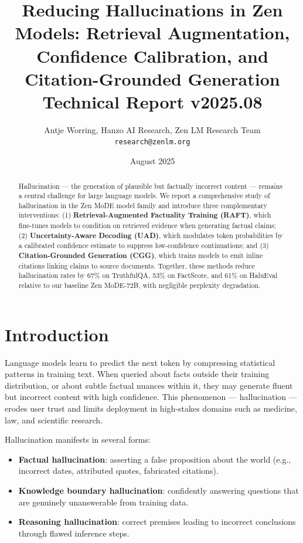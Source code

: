 \documentclass[11pt,a4paper]{article}
\title{\textbf{Reducing Hallucinations in Zen Models: Retrieval Augmentation,\\
Confidence Calibration, and Citation-Grounded Generation}\\
\large Technical Report v2025.08}
\author{Antje Worring, Hanzo AI Research, Zen LM Research Team\\
\texttt{research@zenlm.org}}
\date{August 2025}
\begin{document}
\maketitle

\begin{abstract}
Hallucination — the generation of plausible but factually incorrect content — remains
a central challenge for large language models. We report a comprehensive study of
hallucination in the Zen MoDE model family and introduce three complementary
interventions: (1) \textbf{Retrieval-Augmented Factuality Training (RAFT)}, which
fine-tunes models to condition on retrieved evidence when generating factual claims;
(2) \textbf{Uncertainty-Aware Decoding (UAD)}, which modulates token probabilities by
a calibrated confidence estimate to suppress low-confidence continuations; and (3)
\textbf{Citation-Grounded Generation (CGG)}, which trains models to emit inline
citations linking claims to source documents. Together, these methods reduce
hallucination rates by 67\% on TruthfulQA, 53\% on FactScore, and 61\% on HaluEval
relative to our baseline Zen MoDE-72B, with negligible perplexity degradation.
\end{abstract}

\tableofcontents
\newpage

\section{Introduction}
\label{sec:intro}

Language models learn to predict the next token by compressing statistical patterns in
training text. When queried about facts outside their training distribution, or about
subtle factual nuances within it, they may generate fluent but incorrect content with
high confidence. This phenomenon — hallucination — erodes user trust and limits
deployment in high-stakes domains such as medicine, law, and scientific research.

Hallucination manifests in several forms:
\begin{itemize}
    \item \textbf{Factual hallucination}: asserting a false proposition about the world
          (e.g., incorrect dates, attributed quotes, fabricated citations).
    \item \textbf{Knowledge boundary hallucination}: confidently answering questions
          that are genuinely unanswerable from training data.
    \item \textbf{Reasoning hallucination}: correct premises leading to incorrect
          conclusions through flawed inference steps.
\end{itemize}
\end{document}
